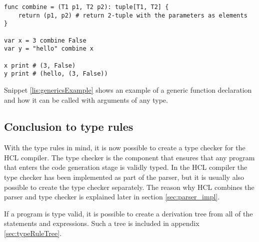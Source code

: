 \begin{lstlisting}[language=HCL,label=lis:genericsExample,caption=An example of a generic function declaration.]
func combine = (T1 p1, T2 p2): tuple[T1, T2] {
	return (p1, p2) # return 2-tuple with the parameters as elements
}

var x = 3 combine False
var y = "hello" combine x

x print # (3, False)
y print # (hello, (3, False))
\end{lstlisting}

Snippet \ref{lis:genericsExample} shows an example of a generic function declaration and how it can be called with arguments of any type.

\subsection{Conclusion to type rules}
With the type rules in mind, it is now possible to create a type checker for the HCL compiler.
The type checker is the component that ensures that any program that enters the code generation stage is validly typed.
In the HCL compiler the type checker has been implemented as part of the parser, but it is usually also possible to create the type checker separately.
The reason why HCL combines the parser and type checker is explained later in section \ref{sec:parser_impl}.

If a program is type valid, it is possible to create a derivation tree from all of the statements and expressions.
Such a tree is included in appendix \ref{sec:typeRuleTree}.

